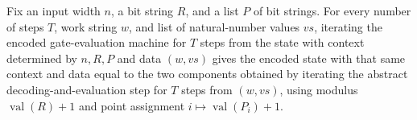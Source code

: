 \begin{theorem}
\label{Randomized.PIT.iterate_gStep}
\leanok
{}
Fix an input width $n$, a bit string $R$, and a list $P$ of bit strings. For every
number of steps $T$, work string $w$, and list of natural-number values $vs$, iterating
the encoded gate-evaluation machine for $T$ steps from the state with context determined
by $n,R,P$ and data $(w,vs)$ gives the encoded state with that same context and data
equal to the two components obtained by iterating the abstract decoding-and-evaluation
step for $T$ steps from $(w,vs)$, using modulus $\operatorname{val}(R)+1$ and point
assignment $i\mapsto \operatorname{val}(P_i)+1$.
\end{theorem}
